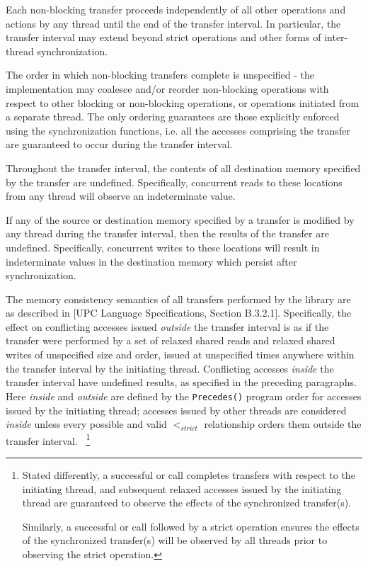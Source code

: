 \np Each non-blocking transfer proceeds independently of all other operations and actions
by any thread until the end of the transfer interval. In particular, the transfer 
interval may extend beyond strict operations and other forms of inter-thread synchronization.

\np The order in which non-blocking transfers complete is unspecified - the implementation may
coalesce and/or reorder non-blocking operations with respect to other blocking or non-blocking operations,
or operations initiated from a separate thread. The only ordering guarantees are those
explicitly enforced using the synchronization functions, i.e. all the accesses comprising the 
transfer are guaranteed to occur during the transfer interval.

\np Throughout the transfer interval, the contents of all destination memory specified by the 
transfer are undefined. Specifically, concurrent reads to these locations from any
thread will observe an indeterminate value.

\np If any of the source or destination memory specified by a transfer is modified by any thread
during the transfer interval, then the results of the transfer are undefined. Specifically, 
concurrent writes to these locations will result in indeterminate values in the destination
memory which persist after synchronization.

\np The memory consistency semantics of all transfers performed by the library are as described in 
[UPC Language Specifications, Section B.3.2.1]. Specifically, the effect on
conflicting accesses issued {\em outside} the transfer interval is as if the transfer were
performed by a set of relaxed shared reads and relaxed shared writes of
unspecified size and order, issued at unspecified times anywhere within the transfer
interval by the initiating thread. Conflicting accesses {\em inside} the transfer interval
have undefined results, as specified in the preceding paragraphs.  
Here {\em inside} and {\em outside} are defined by the {\tt Precedes()} program order for 
accesses issued by the initiating thread; accesses issued by other threads are considered {\em inside} 
unless every possible and valid $<_{strict}$ relationship orders them outside the transfer interval.~%
\footnote{
Stated differently, a successful \sync or \synci call completes transfers with respect 
to the initiating thread, and subsequent relaxed accesses issued by the initiating thread
are guaranteed to observe the effects of the synchronized transfer(s).

Similarly, a successful \sync or \synci call followed by a strict operation 
ensures the effects of the synchronized transfer(s) will be observed by all 
threads prior to observing the strict operation.  
}

